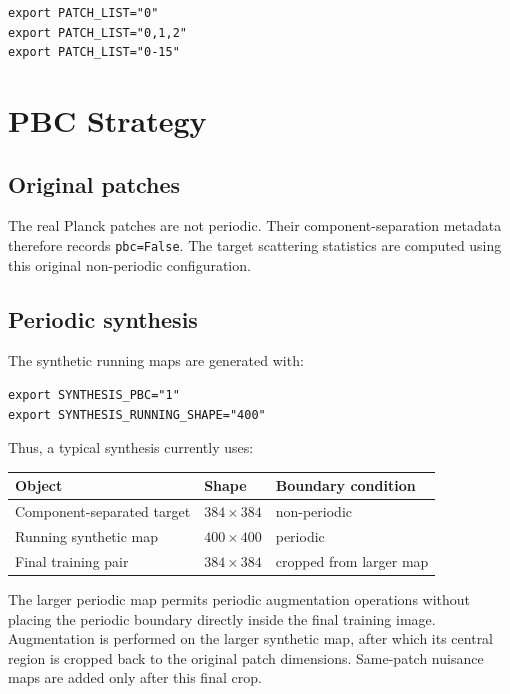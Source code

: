 \documentclass[11pt]{article}
\begin{document}
\begin{lstlisting}
export PATCH_LIST="0"
export PATCH_LIST="0,1,2"
export PATCH_LIST="0-15"
\end{lstlisting}

\section{PBC Strategy}

\subsection{Original patches}

The real Planck patches are not periodic.  Their component-separation metadata
therefore records \texttt{pbc=False}.  The target scattering statistics are
computed using this original non-periodic configuration.

\subsection{Periodic synthesis}

The synthetic running maps are generated with:

\begin{lstlisting}
export SYNTHESIS_PBC="1"
export SYNTHESIS_RUNNING_SHAPE="400"
\end{lstlisting}

Thus, a typical synthesis currently uses:

\begin{center}
\begin{tabular}{lll}
\toprule
Object & Shape & Boundary condition \\
\midrule
Component-separated target & $384 \times 384$ & non-periodic \\
Running synthetic map & $400 \times 400$ & periodic \\
Final training pair & $384 \times 384$ & cropped from larger map \\
\bottomrule
\end{tabular}
\end{center}

The larger periodic map permits periodic augmentation operations without
placing the periodic boundary directly inside the final training image.
Augmentation is performed on the larger synthetic map, after which its central
region is cropped back to the original patch dimensions.  Same-patch nuisance
maps are added only after this final crop.
\end{document}
